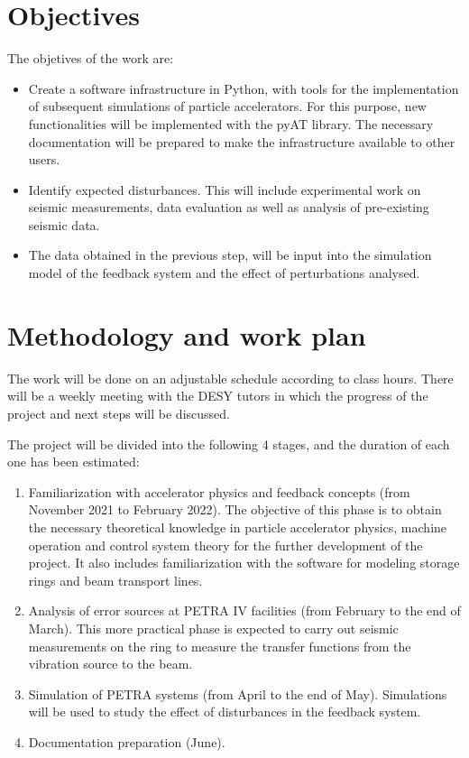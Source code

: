 \documentclass[12pt]{article}
\begin{document}
\section{Objectives}

The objetives of the work are:
\begin{itemize}
    \item Create a software infrastructure in Python, with tools for the implementation of subsequent simulations of particle accelerators. For this purpose, new functionalities will be implemented with the pyAT library. The necessary documentation will be prepared to make the infrastructure available to other users.      
    \item Identify expected disturbances. This will include experimental work on seismic measurements, data evaluation as well as analysis of pre-existing seismic data.
    \item The data obtained in the previous step, will be input into the simulation model of the feedback system and the effect of perturbations analysed.
\end{itemize}

\section{Methodology and work plan}

The work will be done on an adjustable schedule according to class hours. There will be a weekly meeting with the DESY tutors in which the progress of the project and next steps will be discussed.

The project will be divided into the following 4 stages, and the duration of each one has been estimated:

\begin{enumerate}
    \item Familiarization with accelerator physics and feedback concepts (from November 2021 to February 2022). The objective of this phase is to obtain the necessary theoretical knowledge in particle accelerator physics, machine operation and control system theory for the further development of the project. It also includes familiarization with the software for modeling storage rings and beam transport lines.
    \item Analysis of error sources at PETRA IV facilities (from February to the end of March). This more practical phase is expected to carry out seismic measurements on the ring to measure the transfer functions from the vibration source to the beam.
    \item Simulation of PETRA systems (from April to the end of May). Simulations will be used to study the effect of disturbances in the feedback system.
    \item Documentation preparation (June).
\end{enumerate}
\end{document}
